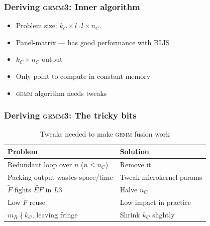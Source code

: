 \documentclass{beamer}
\newcommand*{\gemmt}{{\textsc{gemm3}}}
\newcommand*{\gemm}{{\textsc{gemm}}}
\begin{document}
\begin{frame}
  \frametitle{Deriving \gemmt{}: Inner algorithm}
  \begin{itemize}
  \item Problem size: $k_C \times l \cdot l \times n_C$.
  \item Panel-matrix --- has good performance with BLIS
  \item $k_C \times n_C$ output
  \item Only point to compute in constant memory
  \item \gemm{} algorithm needs tweaks
  \end{itemize}

\end{frame}

\begin{frame}
  \frametitle{Deriving \gemmt{}: The tricky bits}
  \begin{table}
    \centering
    \begin{tabular}{l|l}
      Problem&Solution\\ \hline \hline
      Redundant loop over $n$ ($n \leq n_C$) & Remove it\\
      Packing output wastes space/time & Tweak microkernel params\\
      $\widetilde{F}$ fights $\widetilde{EF}$ in $L3$ & Halve $n_C$\\
      Low $\widetilde{F}$ reuse & Low impact in practice\\
      $m_R \nmid k_C$, leaving fringe & Shrink $k_C$ slightly\\
    \end{tabular}
    \caption{Tweaks needed to make \gemm{} fusion work}
    \label{tab:gemm3-issues}
  \end{table}
\end{frame}
\end{document}
